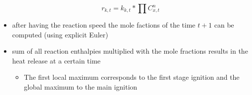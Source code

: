 \documentclass[12pt,oneside,a4paper,english]{article}
\begin{document}
\begin{itemize}
{	\begin{equation}
	r_{k,t} = k_{k,t}* \prod C_{x,t}^n 
	\end{equation}}
	
\item{after having the reaction speed the mole factions of the time $t+1$ can be computed (using explicit Euler)}
\item{sum of all reaction enthalpies multiplied with the mole fractions results in the heat release at a certain time}

	\begin{itemize}
	\item{The first local maximum corresponds to the first stage ignition and the global maximum to the main ignition} \\
	\end{itemize}

\end{itemize}
	
\end{document}
